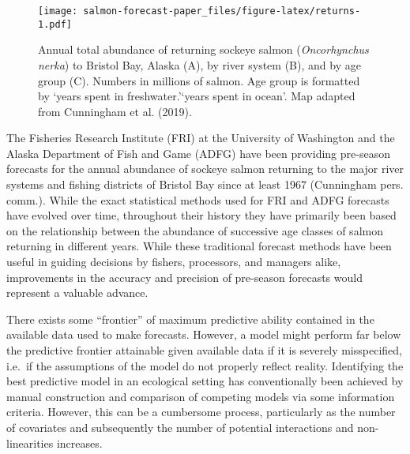 \documentclass[
]{article}
\begin{document}
\begin{figure}
\centering
\texttt{[image: salmon-forecast-paper\_files/figure-latex/returns-1.pdf]}
\caption{\label{fig:returns}Annual total abundance of returning sockeye salmon (\emph{Oncorhynchus nerka}) to Bristol Bay, Alaska (A), by river system (B), and by age group (C). Numbers in millions of salmon. Age group is formatted by `years spent in freshwater.'`years spent in ocean'. Map adapted from Cunningham et al. (2019).}
\end{figure}

The Fisheries Research Institute (FRI) at the University of Washington and the Alaska Department of Fish and Game (ADFG) have been providing pre-season forecasts for the annual abundance of sockeye salmon returning to the major river systems and fishing districts of Bristol Bay since at least 1967 (Cunningham pers. comm.). While the exact statistical methods used for FRI and ADFG forecasts have evolved over time, throughout their history they have primarily been based on the relationship between the abundance of successive age classes of salmon returning in different years. While these traditional forecast methods have been useful in guiding decisions by fishers, processors, and managers alike, improvements in the accuracy and precision of pre-season forecasts would represent a valuable advance.

There exists some ``frontier'' of maximum predictive ability contained in the available data used to make forecasts. However, a model might perform far below the predictive frontier attainable given available data if it is severely misspecified, i.e.~if the assumptions of the model do not properly reflect reality. Identifying the best predictive model in an ecological setting has conventionally been achieved by manual construction and comparison of competing models via some information criteria. However, this can be a cumbersome process, particularly as the number of covariates and subsequently the number of potential interactions and non-linearities increases.
\end{document}
